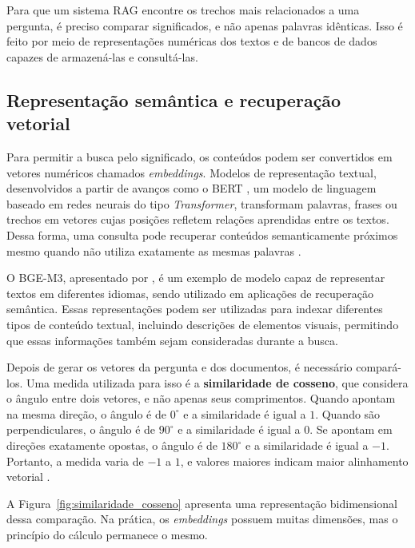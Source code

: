 Para que um sistema RAG encontre os trechos mais relacionados a uma pergunta, é preciso comparar significados, e não apenas palavras idênticas. Isso é feito por meio de representações numéricas dos textos e de bancos de dados capazes de armazená-las e consultá-las.

\subsection{Representação semântica e recuperação vetorial}
\label{subsec:embeddings}
\label{subsec:similaridade_vetorial}

Para permitir a busca pelo significado, os conteúdos podem ser convertidos em vetores numéricos chamados \textit{embeddings}. Modelos de representação textual, desenvolvidos a partir de avanços como o BERT , um modelo de linguagem baseado em redes neurais do tipo \textit{Transformer}, transformam palavras, frases ou trechos em vetores cujas posições refletem relações aprendidas entre os textos. Dessa forma, uma consulta pode recuperar conteúdos semanticamente próximos mesmo quando não utiliza exatamente as mesmas palavras .

O BGE-M3, apresentado por , é um exemplo de modelo capaz de representar textos em diferentes idiomas, sendo utilizado em aplicações de recuperação semântica. Essas representações podem ser utilizadas para indexar diferentes tipos de conteúdo textual, incluindo descrições de elementos visuais, permitindo que essas informações também sejam consideradas durante a busca.

Depois de gerar os vetores da pergunta e dos documentos, é necessário compará-los. Uma medida utilizada para isso é a \textbf{similaridade de cosseno}, que considera o ângulo entre dois vetores, e não apenas seus comprimentos. Quando apontam na mesma direção, o ângulo é de $0^\circ$ e a similaridade é igual a $1$. Quando são perpendiculares, o ângulo é de $90^\circ$ e a similaridade é igual a $0$. Se apontam em direções exatamente opostas, o ângulo é de $180^\circ$ e a similaridade é igual a $-1$. Portanto, a medida varia de $-1$ a $1$, e valores maiores indicam maior alinhamento vetorial .

A Figura~\ref{fig:similaridade_cosseno} apresenta uma representação bidimensional dessa comparação. Na prática, os \textit{embeddings} possuem muitas dimensões, mas o princípio do cálculo permanece o mesmo.

